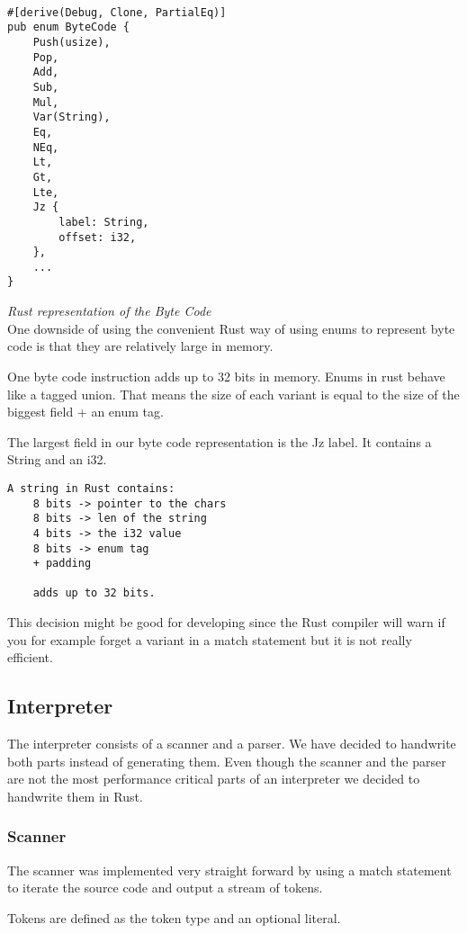 \documentclass{article}
\begin{document}
\begin{verbatim}

#[derive(Debug, Clone, PartialEq)]
pub enum ByteCode {
    Push(usize),
    Pop,
    Add,
    Sub,
    Mul,
    Var(String),
    Eq,
    NEq,
    Lt,
    Gt,
    Lte,
    Jz {
        label: String,
        offset: i32,
    },
    ...
}

\end{verbatim}
\textit{Rust representation of the Byte Code} \\

One downside of using the convenient Rust way of using enums to represent byte
code is that they are relatively large in memory.

One byte code instruction adds up to 32 bits in memory. 
Enums in rust behave like a tagged union. That means the size of each variant
is equal to the size of the biggest field + an enum tag.

The largest field in our byte code representation is the Jz label. It contains
a String and an i32.

\begin{verbatim}
A string in Rust contains:
    8 bits -> pointer to the chars
    8 bits -> len of the string
    4 bits -> the i32 value
    8 bits -> enum tag
    + padding

    adds up to 32 bits.
\end{verbatim}

This decision might be good for developing since the Rust compiler will warn 
if you for example forget a variant in a match statement but it is not really
efficient.

\subsection{Interpreter}
The interpreter consists of a scanner and a parser. We have decided to
handwrite both parts instead of generating them. Even though the scanner and
the parser are not the most performance critical parts of an interpreter we
decided to handwrite them in Rust.

\subsubsection{Scanner}
The scanner was implemented very straight forward by using a match statement 
to iterate the source code and output a stream of tokens.

Tokens are defined as the token type and an optional literal.
\end{document}
